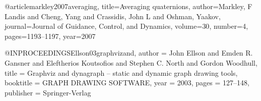 \begin{singlespace}


\end{singlespace}



@article{markley2007averaging,
  title={Averaging quaternions},
  author={Markley, F Landis and Cheng, Yang and Crassidis, John L and Oshman, Yaakov},
  journal={Journal of Guidance, Control, and Dynamics},
  volume={30},
  number={4},
  pages={1193--1197},
  year={2007}
}

@INPROCEEDINGS{Ellson03graphvizand,
    author = {John Ellson and Emden R. Gansner and Eleftherios Koutsofios and Stephen C. North and Gordon Woodhull},
    title = {Graphviz and dynagraph – static and dynamic graph drawing tools},
    booktitle = {GRAPH DRAWING SOFTWARE},
    year = {2003},
    pages = {127--148},
    publisher = {Springer-Verlag}
}
